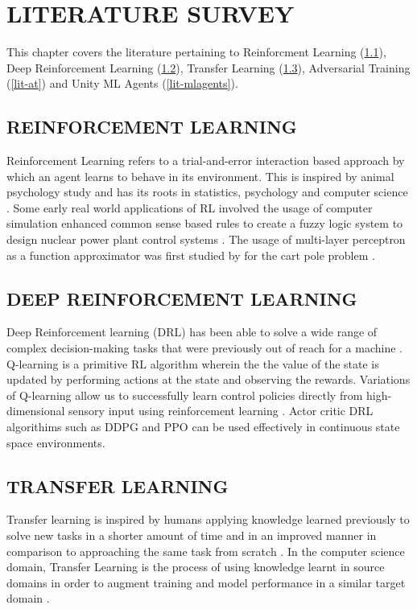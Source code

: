 
\chapter{LITERATURE SURVEY} %

This chapter covers the literature pertaining to Reinforcment Learning
(\ref{lit-rl}), Deep Reinforcement Learning (\ref{lit-drl}), Transfer
Learning (\ref{lit-tl}), Adversarial Training (\ref{lit-at}) and Unity
ML Agents (\ref{lit-mlagents}).

\section{REINFORCEMENT LEARNING} \label{lit-rl}

Reinforcement Learning refers to a trial-and-error interaction based
approach by which an agent learns to behave in its environment. This
is inspired by animal psychology study and has its roots in
statistics, psychology and computer science \cite{RLIntro}. Some early
real world applications of RL involved the usage of computer
simulation enhanced common sense based rules to create a fuzzy logic
system to design nuclear power plant control systems
\cite{RLNuke}. The usage of multi-layer perceptron as a function
approximator was first studied by \cite{RLMLP} for the cart pole
problem \cite{RLCartPole}.

\section{DEEP REINFORCEMENT LEARNING} \label{lit-drl}

Deep Reinforcement learning (DRL) has been able to solve a wide range
of complex decision-making tasks that were previously out of reach for
a machine \cite{DRL2}. Q-learning \cite{Qlearn} is a primitive RL
algorithm wherein the the value of the state is updated by performing
actions at the state and observing the rewards. Variations of
Q-learning allow us to successfully learn control policies directly
from high-dimensional sensory input using reinforcement learning
\cite{DRL1}. Actor critic DRL algorithims such as DDPG
\cite{cont-ddpg} and PPO \cite{ppo} can be used effectively in
continuous state space environments.

\section{TRANSFER LEARNING} \label{lit-tl}
%
Transfer learning is inspired by humans applying knowledge learned
previously to solve new tasks in a shorter amount of time and in an
improved manner in comparison to approaching the same task from
scratch \cite{TLInsp}. In the computer science domain, Transfer
Learning is the process of using knowledge learnt in source domains in
order to augment training and model performance in a similar target
domain \cite{transfer-rl}.

